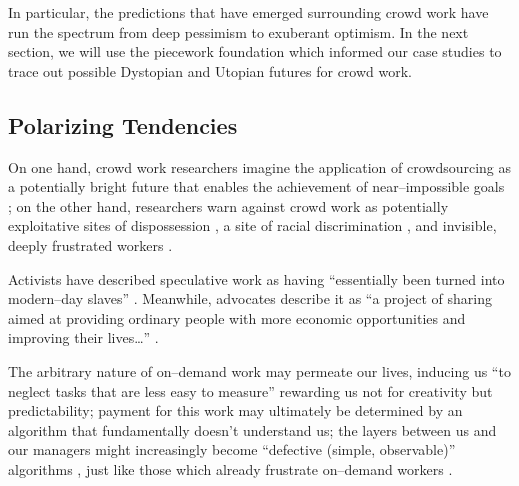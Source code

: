 \documentclass[trackingWork]{subfiles}
\begin{document}
In particular, the predictions that have emerged surrounding crowd work have run the spectrum
from deep pessimism to exuberant optimism. 
In the next section, we will use
the piecework foundation which informed our case studies
to trace out possible Dystopian and Utopian futures for crowd work.

\subsection{Polarizing Tendencies}\label{sec:polarizationOfCrowdWork}
On one hand, crowd work researchers
imagine the application of crowdsourcing as
a potentially bright future that enables the achievement of near--impossible goals
\cite{redballoon,crowdworkFuture,vizwiz}; %
on the other hand, researchers
warn against crowd work as potentially exploitative sites of dispossession \cite{scholz2012digital},
a site of racial discrimination \cite{edelman2015racial},
and invisible, deeply frustrated workers \cite{turkopticon,bighamHalfWorkday}.

Activists have described speculative work as having
``essentially been turned into modern--day slaves''
\cite{activistsHuffPoLawsuit}.
Meanwhile, advocates describe it as
``a project of sharing
aimed at providing ordinary people
with more economic opportunities and
improving their lives\dots''
\cite{uberPropaganda}.

The arbitrary nature of on--demand work may permeate our lives, inducing us
``to neglect tasks that are less easy to measure'' \cite{SJOE:SJOE371}
rewarding us not for creativity but predictability;
payment for this work may ultimately be determined by
an algorithm that fundamentally doesn't understand us;
the layers between us and our managers might increasingly become
``defective (simple, observable)'' algorithms \cite{10.2307/2555446},
just like those which already frustrate
on--demand workers
\cite{uberAlgorithm,dynamo,turkopticon}.
\end{document}
